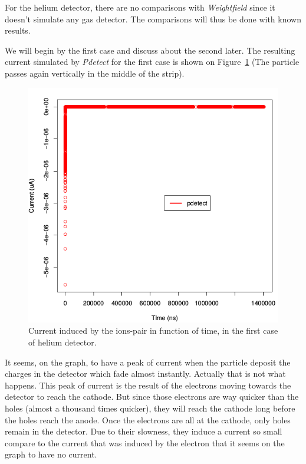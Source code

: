\documentclass[11pt]{article}
\begin{document}
				For the helium detector, there are no comparisons with \textit{Weightfield} since it doesn't simulate
				any gas detector. The comparisons will thus be done with known results.

				We will begin by the first case and discuss about the second later.
				The resulting current simulated by \textit{Pdetect} for the first case is shown on
				Figure~\ref{fig:helium1_unprecise} (The particle passes again vertically in the middle of
				the strip).

				\begin{figure}[H]
				  \center
				  \includegraphics[scale=0.5]{images/applications/helium1_unprecise.png}
				  \caption{Current induced by the ions-pair in function of time, in the first case of helium detector.}
				  \label{fig:helium1_unprecise}
				\end{figure}

				It seems, on the graph, to have a peak of current when the particle deposit the charges in the
				detector which fade almost instantly. Actually that is not what happens. This peak of current
				is the result of the electrons moving towards the detector to reach the cathode. But since those
				electrons are way quicker than the holes (almost a thousand times quicker), they will reach the
				cathode long before the holes reach the anode. Once the electrons are all at the cathode, only holes
				remain in the detector. Due to their slowness, they induce a current so small compare to the
				current that was induced by the electron that it seems on the graph to have no current.
\end{document}
